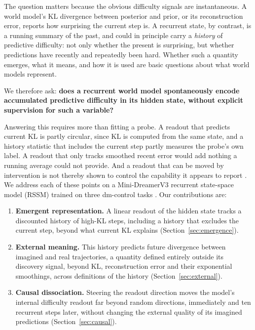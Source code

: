 \documentclass[a4paper,twoside]{article}
\begin{document}
The question matters because the obvious difficulty signals are instantaneous. A world model's KL divergence between posterior and prior, or its reconstruction error, reports how surprising the current step is. A recurrent state, by contrast, is a running summary of the past, and could in principle carry a \emph{history} of predictive difficulty: not only whether the present is surprising, but whether predictions have recently and repeatedly been hard. Whether such a quantity emerges, what it means, and how it is used are basic questions about what world models represent.

We therefore ask: \textbf{does a recurrent world model spontaneously encode accumulated predictive difficulty in its hidden state, without explicit supervision for such a variable?}

Answering this requires more than fitting a probe. A readout that predicts current KL is partly circular, since KL is computed from the same state, and a history statistic that includes the current step partly measures the probe's own label. A readout that only tracks smoothed recent error would add nothing a running average could not provide. And a readout that can be moved by intervention is not thereby shown to control the capability it appears to report \cite{elazar2021amnesic,joshi2026causal}. We address each of these points on a Mini-DreamerV3 recurrent state-space model (RSSM) \cite{hafner2025dreamerv3} trained on three dm-control tasks \cite{tassa2018dmcontrol}. Our contributions are:

\begin{enumerate}
\item \textbf{Emergent representation.} A linear readout of the hidden state tracks a discounted history of high-KL steps, including a history that excludes the current step, beyond what current KL explains (Section~\ref{sec:emergence}).
\item \textbf{External meaning.} This history predicts future divergence between imagined and real trajectories, a quantity defined entirely outside its discovery signal, beyond KL, reconstruction error and their exponential smoothings, across definitions of the history (Section~\ref{sec:external}).
\item \textbf{Causal dissociation.} Steering the readout direction moves the model's internal difficulty readout far beyond random directions, immediately and ten recurrent steps later, without changing the external quality of its imagined predictions (Section~\ref{sec:causal}).
\end{enumerate}
\end{document}
